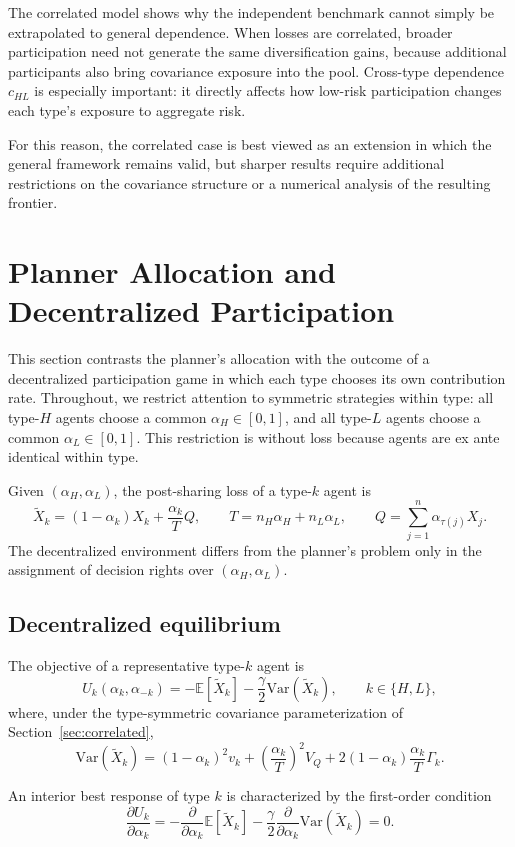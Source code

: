 \documentclass[a4paper,12pt]{article}
\theoremstyle{definition}
\theoremstyle{remark}
\newcommand{\E}{\mathbb{E}}
\newcommand{\Var}{\mathrm{Var}}
\newcommand{\1}{\mathbf{1}}
\begin{document}
The correlated model shows why the independent benchmark cannot simply be
extrapolated to general dependence. When losses are correlated, broader
participation need not generate the same diversification gains, because
additional participants also bring covariance exposure into the pool.
Cross-type dependence \(c_{HL}\) is especially important: it directly affects
how low-risk participation changes each type's exposure to aggregate risk.

For this reason, the correlated case is best viewed as an extension in which
the general framework remains valid, but sharper results require additional
restrictions on the covariance structure or a numerical analysis of the
resulting frontier.

\section{Planner Allocation and Decentralized Participation}
\label{sec:decentralized}

This section contrasts the planner's allocation with the outcome of a
decentralized participation game in which each type chooses its own
contribution rate. Throughout, we restrict attention to symmetric strategies
within type: all type-\(H\) agents choose a common \(\alpha_H\in[0,1]\), and
all type-\(L\) agents choose a common \(\alpha_L\in[0,1]\). This restriction
is without loss because agents are ex ante identical within type.

Given \((\alpha_H,\alpha_L)\), the post-sharing loss of a type-\(k\) agent is
\[
\tilde X_k=(1-\alpha_k)X_k+\frac{\alpha_k}{T}Q,
\qquad
T=n_H\alpha_H+n_L\alpha_L,
\qquad
Q=\sum_{j=1}^n \alpha_{\tau(j)}X_j.
\]
The decentralized environment differs from the planner's problem only in the
assignment of decision rights over \((\alpha_H,\alpha_L)\).

\subsection{Decentralized equilibrium}

The objective of a representative type-\(k\) agent is
\[
U_k(\alpha_k,\alpha_{-k})
=
-\E[\tilde X_k]-\frac{\gamma}{2}\Var(\tilde X_k),
\qquad k\in\{H,L\},
\]
where, under the type-symmetric covariance parameterization of
Section~\ref{sec:correlated},
\[
\Var(\tilde X_k)
=
(1-\alpha_k)^2v_k
+
\left(\frac{\alpha_k}{T}\right)^{\!2}V_Q
+
2(1-\alpha_k)\frac{\alpha_k}{T}\Gamma_k.
\]

An interior best response of type \(k\) is characterized by the first-order
condition
\begin{equation}
\frac{\partial U_k}{\partial \alpha_k}
=
-\frac{\partial}{\partial \alpha_k}\E[\tilde X_k]
-\frac{\gamma}{2}\frac{\partial}{\partial \alpha_k}\Var(\tilde X_k)
=0.
\label{eq:decentralized-BR-FOC}
\end{equation}
\end{document}
